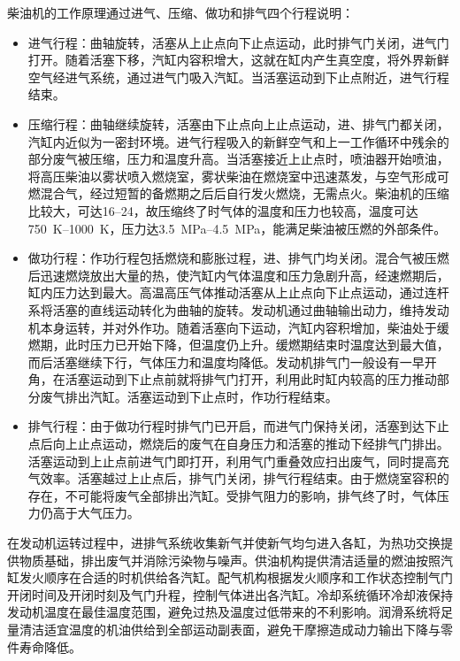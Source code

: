 \documentclass[UTF8]{ctexart}
\numberwithin{figure}{section}
\numberwithin{table}{section}
\begin{document}
柴油机的工作原理通过进气、压缩、做功和排气四个行程说明：

\begin{itemize}
	\item 进气行程：曲轴旋转，活塞从上止点向下止点运动，此时排气门关闭，进气门打开。随着活塞下移，汽缸内容积增大，这就在缸内产生真空度，将外界新鲜空气经进气系统，通过进气门吸入汽缸。当活塞运动到下止点附近，进气行程结束。

	\item 压缩行程：曲轴继续旋转，活塞由下止点向上止点运动，进、排气门都关闭，汽缸内近似为一密封环境。进气行程吸入的新鲜空气和上一工作循环中残余的部分废气被压缩，压力和温度升高。当活塞接近上止点时，喷油器开始喷油，将高压柴油以雾状喷入燃烧室，雾状柴油在燃烧室中迅速蒸发，与空气形成可燃混合气，经过短暂的备燃期之后后自行发火燃烧，无需点火。柴油机的压缩比较大，可达\numrange[range-phrase = $\,\sim\,$]{16}{24}，故压缩终了时气体的温度和压力也较高，温度可达\qtyrange[range-phrase = $\,\sim\,$, range-units = single]{750}{1000}{\kelvin}，压力达\qtyrange[range-phrase = $\,\sim\,$, range-units = single]{3.5}{4.5}{\mega\pascal}，能满足柴油被压燃的外部条件。

	\item 做功行程：作功行程包括燃烧和膨胀过程，进、排气门均关闭。混合气被压燃后迅速燃烧放出大量的热，使汽缸内气体温度和压力急剧升高，经速燃期后，缸内压力达到最大。高温高压气体推动活塞从上止点向下止点运动，通过连杆系将活塞的直线运动转化为曲轴的旋转。发动机通过曲轴输出动力，维持发动机本身运转，并对外作功。随着活塞向下运动，汽缸内容积增加，柴油处于缓燃期，此时压力已开始下降，但温度仍上升。缓燃期结束时温度达到最大值，而后活塞继续下行，气体压力和温度均降低。发动机排气门一般设有一早开角，在活塞运动到下止点前就将排气门打开，利用此时缸内较高的压力推动部分废气排出汽缸。活塞运动到下止点时，作功行程结束。

	\item 排气行程：由于做功行程时排气门已开启，而进气门保持关闭，活塞到达下止点后向上止点运动，燃烧后的废气在自身压力和活塞的推动下经排气门排出。活塞运动到上止点前进气门即打开，利用气门重叠效应扫出废气，同时提高充气效率。活塞越过上止点后，排气门关闭，排气行程结束。由于燃烧室容积的存在，不可能将废气全部排出汽缸。受排气阻力的影响，排气终了时，气体压力仍高于大气压力。
\end{itemize}

在发动机运转过程中，进排气系统收集新气并使新气均匀进入各缸，为热功交换提供物质基础，排出废气并消除污染物与噪声。供油机构提供清洁适量的燃油按照汽缸发火顺序在合适的时机供给各汽缸。配气机构根据发火顺序和工作状态控制气门开闭时间及开闭时刻及气门升程，控制气体进出各汽缸。冷却系统循环冷却液保持发动机温度在最佳温度范围，避免过热及温度过低带来的不利影响。润滑系统将足量清洁适宜温度的机油供给到全部运动副表面，避免干摩擦造成动力输出下降与零件寿命降低。
\end{document}
